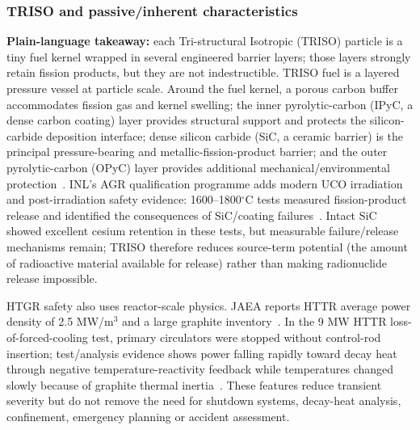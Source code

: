 \subsubsection{TRISO and passive/inherent characteristics}
\textbf{Plain-language takeaway:} each Tri-structural Isotropic (TRISO) particle is a tiny fuel kernel wrapped in several engineered barrier layers; those layers strongly retain fission products, but they are not indestructible. TRISO fuel is a layered pressure vessel at particle scale. Around the fuel kernel, a porous carbon buffer accommodates fission gas and kernel swelling; the inner pyrolytic-carbon (IPyC, a dense carbon coating) layer provides structural support and protects the silicon-carbide deposition interface; dense silicon carbide (SiC, a ceramic barrier) is the principal pressure-bearing and metallic-fission-product barrier; and the outer pyrolytic-carbon (OPyC) layer provides additional mechanical/environmental protection~\cite{sawa2001httrfuel,sawaueta2004}. INL's AGR qualification programme adds modern UCO irradiation and post-irradiation safety evidence: 1600--1800$^\circ$C tests measured fission-product release and identified the consequences of SiC/coating failures~\cite{demkowicz2015facs,morris2016agr1,inlagrrelease}. Intact SiC showed excellent cesium retention in these tests, but measurable failure/release mechanisms remain; TRISO therefore reduces source-term potential (the amount of radioactive material available for release) rather than making radionuclide release impossible.

HTGR safety also uses reactor-scale physics. JAEA reports HTTR average power density of 2.5 MW/m$^3$ and a large graphite inventory~\cite{jaeahttr2026ops}. In the 9 MW HTTR loss-of-forced-cooling test, primary circulators were stopped without control-rod insertion; test/analysis evidence shows power falling rapidly toward decay heat through negative temperature-reactivity feedback while temperatures changed slowly because of graphite thermal inertia~\cite{takamatsu2011lofc}. These features reduce transient severity but do not remove the need for shutdown systems, decay-heat analysis, confinement, emergency planning or accident assessment.

